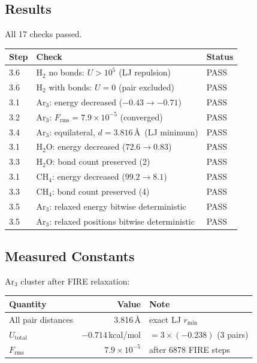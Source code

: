 \documentclass[11pt]{article}
\begin{document}
\subsection{Results}

All 17 checks passed.

\begin{center}
\begin{tabular}{lll}
\toprule
Step & Check & Status \\
\midrule
3.6 & H$_2$ no bonds: $U > 10^5$ (LJ repulsion) & PASS \\
3.6 & H$_2$ with bonds: $U = 0$ (pair excluded) & PASS \\
\midrule
3.1 & Ar$_3$: energy decreased ($-0.43 \to -0.71$) & PASS \\
3.2 & Ar$_3$: $F_{\mathrm{rms}} = 7.9 \times 10^{-5}$ (converged) & PASS \\
3.4 & Ar$_3$: equilateral, $d = 3.816$\,\AA\ (LJ minimum) & PASS \\
\midrule
3.1 & H$_2$O: energy decreased ($72.6 \to 0.83$) & PASS \\
3.3 & H$_2$O: bond count preserved (2) & PASS \\
3.1 & CH$_4$: energy decreased ($99.2 \to 8.1$) & PASS \\
3.3 & CH$_4$: bond count preserved (4) & PASS \\
\midrule
3.5 & Ar$_3$: relaxed energy bitwise deterministic & PASS \\
3.5 & Ar$_3$: relaxed positions bitwise deterministic & PASS \\
\bottomrule
\end{tabular}
\end{center}

\subsection{Measured Constants}

Ar$_3$ cluster after FIRE relaxation:
\begin{center}
\begin{tabular}{lrl}
\toprule
Quantity & Value & Note \\
\midrule
All pair distances & 3.816\,\AA & exact LJ $r_{\min}$ \\
$U_{\mathrm{total}}$ & $-0.714$\,kcal/mol & $= 3 \times (-0.238)$ (3 pairs) \\
$F_{\mathrm{rms}}$ & $7.9 \times 10^{-5}$ & after 6878 FIRE steps \\
\bottomrule
\end{tabular}
\end{center}
\end{document}

